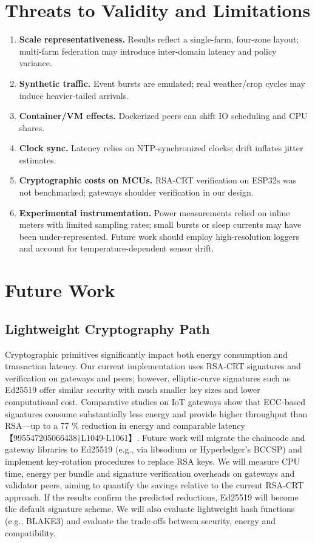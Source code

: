 \documentclass[12pt,onecolumn]{IEEEtran} %
\begin{document}
\section{Threats to Validity and Limitations}
\begin{enumerate}
  \item \textbf{Scale representativeness.} Results reflect a single-farm, four-zone layout; multi-farm federation may introduce inter-domain latency and policy variance.
  \item \textbf{Synthetic traffic.} Event bursts are emulated; real weather/crop cycles may induce heavier-tailed arrivals.
  \item \textbf{Container/VM effects.} Dockerized peers can shift IO scheduling and CPU shares.
  \item \textbf{Clock sync.} Latency relies on NTP-synchronized clocks; drift inflates jitter estimates.
  \item \textbf{Cryptographic costs on MCUs.} RSA-CRT verification on ESP32s was not benchmarked; gateways shoulder verification in our design.
  \item \textbf{Experimental instrumentation.} Power measurements relied on inline meters with limited sampling rates; small bursts or sleep currents may have been under-represented.  Future work should employ high-resolution loggers and account for temperature-dependent sensor drift.
\end{enumerate}


\section{Future Work}
\label{sec:future-work}
\subsection{Lightweight Cryptography Path}
Cryptographic primitives significantly impact both energy consumption and transaction latency.
Our current implementation uses RSA‑CRT signatures and verification on gateways and peers;
however, elliptic‑curve signatures such as Ed25519 offer similar security with much smaller key
sizes and lower computational cost.  Comparative studies on IoT gateways show that ECC‑based
signatures consume substantially less energy and provide higher throughput than RSA—up to a
77 \% reduction in energy and comparable latency【995547205066438†L1049-L1061】.
Future work will migrate the chaincode and gateway libraries to Ed25519 (e.g., via
libsodium or Hyperledger’s BCCSP) and implement key‑rotation procedures to replace RSA keys.
We will measure CPU time, energy per bundle and signature verification overheads on gateways
and validator peers, aiming to quantify the savings relative to the current RSA‑CRT approach.
If the results confirm the predicted reductions, Ed25519 will become the default signature
scheme.  We will also evaluate lightweight hash functions (e.g., BLAKE3) and evaluate the
trade‑offs between security, energy and compatibility.
\end{document}
